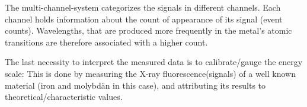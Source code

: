 The multi-channel-system categorizes the signals in different channels. Each channel holds information about the count of appearance of its signal (event counts). Wavelengths, that are produced more frequently in the metal's atomic transitions are therefore associated with a higher count.

The last necessity to interpret the measured data is to calibrate/gauge the energy scale: This is done by measuring the X-ray fluorescence(signals) of a well known material (iron and molybdän in this case), and attributing its results to theoretical/characteristic values. 




